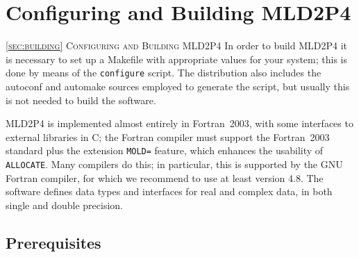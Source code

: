 \section{Configuring and Building MLD2P4\label{sec:building}}
         {\textsc{\ref{sec:building} Configuring and Building MLD2P4}}
In order to build MLD2P4 it is necessary to set up a Makefile with appropriate
values for your system; this is done by means of the \verb|configure|
script. The distribution also includes the autoconf and automake
sources employed to generate the script, but usually this is not needed
to build the software. 

MLD2P4 is implemented almost entirely in Fortran~2003, with some
interfaces to external libraries in C; the Fortran compiler
must support the Fortran~2003 standard plus the extension \verb|MOLD=|
feature, which enhances the usability of \verb|ALLOCATE|. 
Many compilers do this; in particular, this is
supported by the GNU Fortran compiler, for which we 
recommend to use at least version 4.8. 
The software defines data types and interfaces for
real and complex data, in both single and double precision. 

\subsection{Prerequisites}

